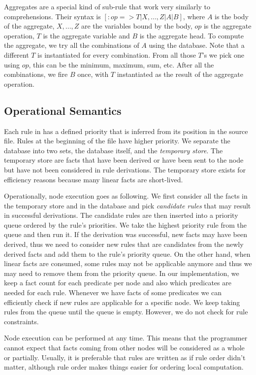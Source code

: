 Aggregates are a special kind of sub-rule that work very similarly to comprehensions. Their syntax is $[:op => T | X, ..., Z | A | B]$, where $A$ is the body of the aggregate, $X, ..., Z$ are the variables bound by the body, $op$ is the aggregate operation, $T$ is the aggregate variable and $B$ is the aggregate head. To compute the aggregate, we try all the combinations of $A$ using the database. Note that a different $T$ is instantiated for every combination. From all those $T$'s we pick one using $op$, this can be the minimum, maximum, sum, etc. After all the combinations, we fire $B$ once, with $T$ instantiated as the result of the aggregate operation.

\subsection{Operational Semantics}

Each rule in \lang has a defined priority that is inferred from its position in the source file. Rules at the beginning of the file have higher priority. We separate the database into two sets,
the database itself, and the \emph{temporary store}. The temporary store are facts that have been
derived or have been sent to the node but have not been considered in rule derivations.
The temporary store exists for efficiency reasons because many linear facts are short-lived.

Operationally, node execution goes as following. We first consider all the facts in the
temporary store and in the database and pick \emph{candidate rules} that may result in
successful derivations. The candidate rules are then inserted into a priority queue ordered
by the rule's priorities. We take the highest priority rule from the queue and then run it.
If the derivation was successful, new facts may have been derived, thus we need to consider new
rules that are candidates from the newly derived facts and add them to the rule's priority queue.
On the other hand, when linear facts are consumed, some rules may not be applicable anymore and thus
we may need to remove them from the priority queue. In our implementation,
we keep a fact count for each predicate per node and also which predicates are needed for each rule. Whenever we have facts of some
predicates we can efficiently check if new rules are applicable for a specific node. We keep taking rules from the
queue until the queue is empty. However, we do not check for rule constraints.

Node execution can be performed at any time. This means that the programmer cannot expect
that facts coming from other nodes will be considered as a whole or partially.
Usually, it is preferable that rules are written as if rule order didn't matter, although
rule order makes things easier for ordering local computation.

